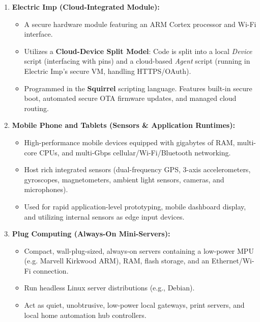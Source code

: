 \documentclass[12pt,a4paper]{article}
\begin{document}
\begin{enumerate}[leftmargin=*, itemsep=4.0pt]
\begin{itemize}[leftmargin=*, label=$\bullet$, itemsep=1.5pt]
        \end{itemize}
  \item \textbf{Electric Imp (Cloud-Integrated Module):}
        \begin{itemize}[leftmargin=*, label=$\bullet$, itemsep=1.5pt]
          \item A secure hardware module featuring an ARM Cortex processor and Wi-Fi interface.
          \item Utilizes a \textbf{Cloud-Device Split Model}: Code is split into a local \textit{Device} script (interfacing with pins) and a cloud-based \textit{Agent} script (running in Electric Imp's secure VM, handling HTTPS/OAuth).
          \item Programmed in the \textbf{Squirrel} scripting language. Features built-in secure boot, automated secure OTA firmware updates, and managed cloud routing.
        \end{itemize}
  \item \textbf{Mobile Phone and Tablets (Sensors \& Application Runtimes):}
        \begin{itemize}[leftmargin=*, label=$\bullet$, itemsep=1.5pt]
          \item High-performance mobile devices equipped with gigabytes of RAM, multi-core CPUs, and multi-Gbps cellular/Wi-Fi/Bluetooth networking.
          \item Host rich integrated sensors (dual-frequency GPS, 3-axis accelerometers, gyroscopes, magnetometers, ambient light sensors, cameras, and microphones).
          \item Used for rapid application-level prototyping, mobile dashboard display, and utilizing internal sensors as edge input devices.
        \end{itemize}
  \item \textbf{Plug Computing (Always-On Mini-Servers):}
        \begin{itemize}[leftmargin=*, label=$\bullet$, itemsep=1.5pt]
          \item Compact, wall-plug-sized, always-on servers containing a low-power MPU (e.g. Marvell Kirkwood ARM), RAM, flash storage, and an Ethernet/Wi-Fi connection.
          \item Run headless Linux server distributions (e.g., Debian).
          \item Act as quiet, unobtrusive, low-power local gateways, print servers, and local home automation hub controllers.
        \end{itemize}
\end{enumerate}
\end{document}
